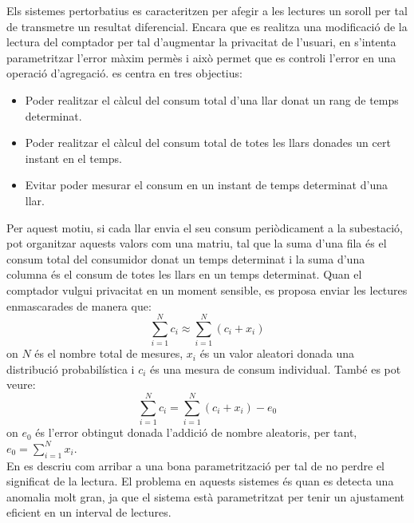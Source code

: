 
Els sistemes pertorbatius es caracteritzen per afegir a les lectures un soroll per tal de transmetre un resultat diferencial. Encara que es realitza una modificació de la lectura del comptador per tal d'augmentar la privacitat de l'usuari, en \cite{smart-grid-technique} s'intenta parametritzar l'error màxim permès i això permet que es controli l'error en una operació d'agregació. \cite{smart-grid-technique} es centra en tres objectius:
\begin{itemize}
	\item Poder realitzar el càlcul del consum total d'una llar donat un rang de temps determinat.
	\item Poder realitzar el càlcul del consum total de totes les llars donades un cert instant en el temps.
	\item Evitar poder mesurar el consum en un instant de temps determinat d'una llar.
\end{itemize}
Per aquest motiu, si cada llar envia el seu consum periòdicament a la subestació, pot organitzar aquests valors com una matriu, tal que la suma d'una fila és el consum total del consumidor donat un temps determinat i la suma d'una columna és el consum de totes les llars en un temps determinat. Quan el comptador vulgui privacitat en un moment sensible, es proposa enviar les lectures enmascarades de manera que:
\[\sum_{i=1}^{N} c_i \approx \sum_{i=1}^{N} (c_i + x_i)\]
on $N$ és el nombre total de mesures, $x_i$ és un valor aleatori donada una distribució probabilística i $c_i$ és una mesura de consum individual. També es pot veure:
\[\sum_{i=1}^{N} c_i = \sum_{i=1}^{N} (c_i + x_i) - e_0\]
on $e_0$ és l'error obtingut donada l'addició de nombre aleatoris, per tant, $e_0 = \sum_{i=1}^{N}x_i$.\\
En \cite{smart-grid-technique} es descriu com arribar a una bona parametrització per tal de no perdre el significat de la lectura. El problema en aquests sistemes és quan es detecta una anomalia molt gran, ja que el sistema està parametritzat per tenir un ajustament eficient en un interval de lectures.
